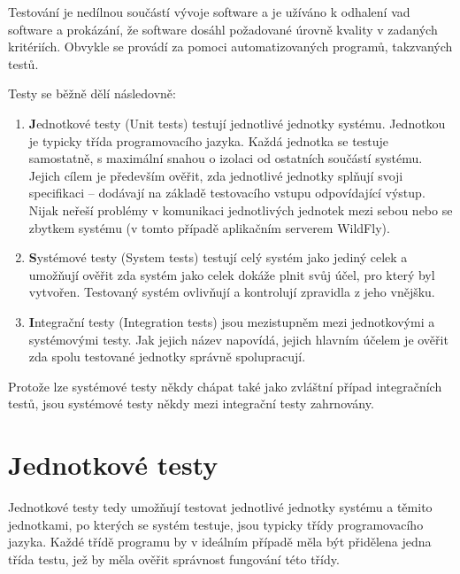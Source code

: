 Testování je nedílnou součástí vývoje software a je užíváno k odhalení vad software a prokázání, že software dosáhl požadované úrovně kvality v zadaných kritériích. Obvykle se provádí za pomoci automatizovaných programů, takzvaných testů. \cite{ivsTest}

Testy se běžně dělí následovně: \cite{testsTypes}\cite{ivsTest}

\begin{enumerate}
  
  \item {\textbf Jednotkové testy (Unit tests)} testují jednotlivé jednotky systému. Jednotkou je typicky třída programovacího jazyka. Každá jednotka se testuje samostatně, s maximální snahou o izolaci od ostatních součástí systému. Jejich cílem je především ověřit, zda jednotlivé jednotky splňují svoji specifikaci -- dodávají na základě testovacího vstupu odpovídající výstup. Nijak neřeší problémy v komunikaci jednotlivých jednotek mezi sebou nebo se zbytkem systému (v tomto případě aplikačním serverem WildFly). \cite{testsTypes}\cite{ivsTest}
  
  \item {\textbf Systémové testy (System tests)} testují celý systém jako jediný celek a umožňují ověřit zda systém jako celek dokáže plnit svůj účel, pro který byl vytvořen. Testovaný systém ovlivňují a kontrolují zpravidla z jeho vnějšku. \cite{testsTypes}\cite{ivsTest}
  
  \item {\textbf Integrační testy (Integration tests)} jsou mezistupněm mezi jednotkovými a systémovými testy. Jak jejich název napovídá, jejich hlavním účelem je ověřit zda spolu testované jednotky správně spolupracují. \cite{testsTypes}\cite{ivsTest}
  
\end{enumerate}

Protože lze systémové testy někdy chápat také jako zvláštní případ integračních testů, jsou systémové testy někdy mezi integrační testy zahrnovány. \cite{testsUnitVsInteg}

\section{Jednotkové testy}

Jednotkové testy tedy umožňují testovat jednotlivé jednotky systému a těmito jednotkami, po kterých se systém testuje, jsou typicky třídy programovacího jazyka. Každé třídě programu by v ideálním případě měla být přidělena jedna třída testu, jež by měla ověřit správnost fungování této třídy.


